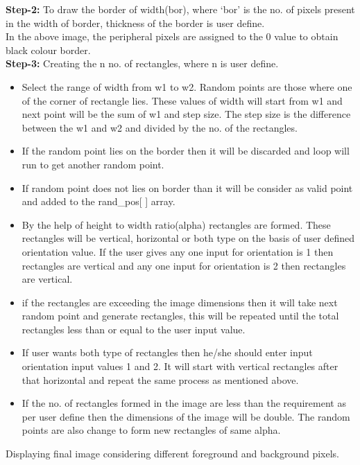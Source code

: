 \documentclass{report}
\begin{document}
\noindent \textbf{Step-2:} To draw the border of width(bor), where `bor' is the no. of pixels present in the width of border, thickness of the border is user define.\\
\noindent In the above image, the peripheral pixels are assigned to the 0 value to obtain black colour border.\\

\noindent \textbf{Step-3:} Creating the n no. of rectangles, where n is user define.\\
\begin{itemize}
    \item Select the range of width from w1 to w2. Random points are those where one of the corner of rectangle lies. These values of width will start from w1 and next point will be the sum of w1 and step size. The step size is the difference between the w1 and w2 and divided by the no. of the rectangles.
    \item If the random point lies on the border then it will be discarded and loop will run to get another random point.
    \item If random point does not lies on border than it will be consider as valid point and added to the rand\_pos[ ] array.
    \item By the help of height to width ratio(alpha) rectangles are formed. These rectangles will be vertical, horizontal or both type on the basis of user defined orientation value. If the user gives any one input for orientation is 1 then rectangles are vertical and any one input for orientation is 2 then rectangles are vertical.
    \item if the rectangles are exceeding the image dimensions   then it will take next random point and generate rectangles, this will be repeated until the total rectangles less than or equal to the user input value.
    \item If user wants both type of rectangles then he/she should enter input orientation input values 1 and 2. It will start with vertical rectangles after that horizontal and repeat the same process as mentioned above.
    \item If the no. of rectangles formed in the image are less than the requirement as per user define then the dimensions of the image will be double. The random points are also change to form new rectangles of same alpha.
    
\end{itemize}

 Displaying final image considering different foreground and background pixels.
\end{document}
